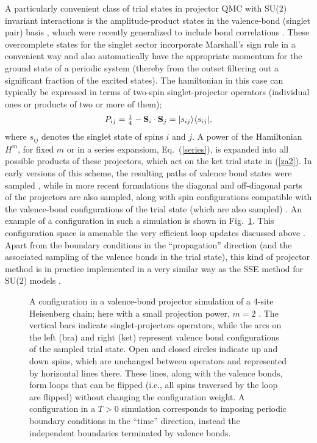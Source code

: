 \documentclass[range]{ar2e}
\begin{document}
A particularly convenient class of trial states in projector QMC with SU($2$) invariant interactions is the amplitude-product states in the valence-bond
(singlet pair) basis \cite{Liang88}, whuch were recently generalized to include bond correlations \cite{Lin12}. These overcomplete states for the singlet 
sector incorporate Marshall's sign rule in a convenient way and also automatically have the appropriate momentum for the ground state of a periodic system 
(thereby from the outset filtering out a significant fraction of the excited states). The hamiltonian in this case can typically be expressed in terms of 
two-spin singlet-projector operators  (individual ones or products of two or more of them);
\begin{equation}
P_{ij}=\hbox{$\frac{1}{4}$}-{\bf S}_i\cdot {\bf S}_j = |s_{ij}\rangle\langle s_{ij}|,
\label{psinglet}
\end{equation}
where $s_{ij}$ denotes the singlet state of spins $i$ and $j$. A power of the Hamiltonian $H^m$, for fixed $m$ or in a series expansiom, Eq.~(\ref{series}),
is expanded into all possible products of these projectors, which act on the ket trial state in (\ref{za2}). In early versions of this scheme, the resulting 
paths of valence bond states were sampled \cite{Liang90,Santoro99,Sandvik05}, while in more recent formulations the diagonal and off-diagonal parts of the 
projectors are also sampled, along with spin configurations compatible with the valence-bond configurations of the trial state (which are also sampled) 
\cite{Sandvik10c}. An example of a configuration in such a simulation is shown in Fig.~\ref{loops}. This configuration space is amenable the very efficient 
loop updates discussed above \cite{Sandvik10a}. Apart from the boundary conditions in the ``propagation'' direction (and the associated sampling of the
valence bonds in the trial state), this kind of projector method is in practice implemented in a very similar way as the SSE method for SU($2$) 
models \cite{Sandvik10b}.

\begin{figure}
\centerline{}
\caption{A configuration in a valence-bond projector simulation of a 4-site Heisenberg chain; here with a small projection power, 
$m=2$ \cite{Sandvik10a}. The vertical bars indicate singlet-projectors operators, while the arcs on the left (bra) and right (ket) represent 
valence bond configurations of the sampled trial state. Open and closed circles indicate up and down spins, which are unchanged between 
operators and represented by horizontal lines there. These lines, along with the valence bonds, form loops that can be flipped (i.e., 
all spins traversed by the loop are flipped) without changing the configuration weight. A configuration in a $T>0$ simulation corresponds 
to imposing periodic boundary conditions in the ``time'' direction, instead the independent boundaries terminated by valence bonds.}
\label{loops}
\end{figure}
\end{document}

